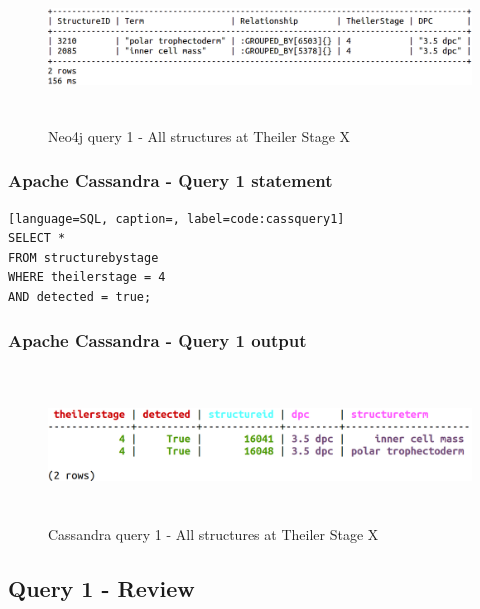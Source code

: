 \begin{figure}[H]\begin{center}\includegraphics[height=4cm,width=0.9\linewidth]{images/neo4jquery1terminal}\caption{Neo4j query 1 - All structures at Theiler Stage X}\label{fig:neo4jquery1terminal}\end{center}\end{figure}

\subsubsection*{Apache Cassandra - Query 1 statement}\label{cassquery1statement}

\begin{lstlisting}[language=SQL, caption=, label=code:cassquery1]
SELECT *
FROM structurebystage
WHERE theilerstage = 4
AND detected = true;
\end{lstlisting}

\subsubsection*{Apache Cassandra - Query 1 output}\label{cassquery1output}

\begin{figure}[H]\begin{center}\includegraphics[height=4cm,width=0.9\linewidth]{images/cassandraquery1}\caption{Cassandra query 1 - All structures at Theiler Stage X}\label{fig:cassandraquery1}\end{center}\end{figure}

\subsection*{Query 1 - Review}\label{query1review}

